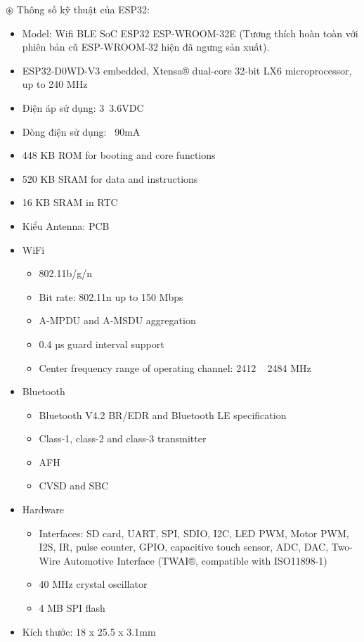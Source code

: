 $\circledast$ Thông số kỹ thuật của ESP32:
\begin{itemize}
	\item Model: Wifi BLE SoC ESP32 ESP-WROOM-32E (Tương thích hoàn toàn với phiên bản cũ ESP-WROOM-32 hiện đã ngưng sản xuất).
	\item ESP32-D0WD-V3 embedded, Xtensa® dual-core 32-bit LX6 microprocessor, up to 240 MHz
	\item Điện áp sử dụng: 3~3.6VDC
	\item Dòng điện sử dụng: ~90mA
	\item 448 KB ROM for booting and core functions
	\item 520 KB SRAM for data and instructions
	\item 16 KB SRAM in RTC
	\item Kiểu Antenna: PCB
	\item WiFi
	\begin{itemize}
		\item 802.11b/g/n
		\item Bit rate: 802.11n up to 150 Mbps
		\item A-MPDU and A-MSDU aggregation
		\item 0.4 µs guard interval support
		\item Center frequency range of operating channel: 2412 ~ 2484 MHz 
	\end{itemize}
	\item Bluetooth
	\begin{itemize}
		\item Bluetooth V4.2 BR/EDR and Bluetooth LE specification
		\item Class-1, class-2 and class-3 transmitter
		\item AFH
		\item CVSD and SBC
	\end{itemize}
	\item Hardware
	\begin{itemize}
		\item Interfaces: SD card, UART, SPI, SDIO, I2C, LED PWM, Motor PWM, I2S, IR, pulse counter, GPIO, capacitive touch sensor, ADC, DAC, Two-Wire Automotive Interface (TWAI®, compatible with ISO11898-1)
		\item 40 MHz crystal oscillator
		\item 4 MB SPI flash
	\end{itemize}
	\item Kích thước: 18 x 25.5 x 3.1mm
\end{itemize}

